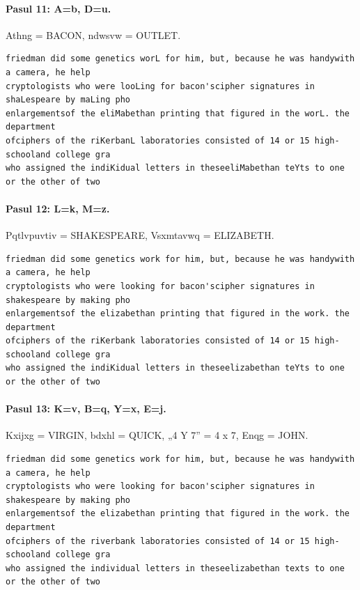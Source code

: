 \paragraph{Pasul 11: A=b, D=u.} Athng = BACON, ndwsvw = OUTLET.
\begin{lstlisting}[language={}]
friedman did some genetics worL for him, but, because he was handywith a camera, he help
cryptologists who were looLing for bacon'scipher signatures in shaLespeare by maLing pho
enlargementsof the eliMabethan printing that figured in the worL. the department
ofciphers of the riKerbanL laboratories consisted of 14 or 15 high-schooland college gra
who assigned the indiKidual letters in theseeliMabethan teYts to one or the other of two
\end{lstlisting}

\paragraph{Pasul 12: L=k, M=z.} Pqtlvpuvtiv = SHAKESPEARE, Vsxmtavwq = ELIZABETH.
\begin{lstlisting}[language={}]
friedman did some genetics work for him, but, because he was handywith a camera, he help
cryptologists who were looking for bacon'scipher signatures in shakespeare by making pho
enlargementsof the elizabethan printing that figured in the work. the department
ofciphers of the riKerbank laboratories consisted of 14 or 15 high-schooland college gra
who assigned the indiKidual letters in theseelizabethan teYts to one or the other of two
\end{lstlisting}

\paragraph{Pasul 13: K=v, B=q, Y=x, E=j.} Kxijxg = VIRGIN, bdxhl = QUICK, „4 Y 7” = 4 x 7, Enqg = JOHN.
\begin{lstlisting}[language={}]
friedman did some genetics work for him, but, because he was handywith a camera, he help
cryptologists who were looking for bacon'scipher signatures in shakespeare by making pho
enlargementsof the elizabethan printing that figured in the work. the department
ofciphers of the riverbank laboratories consisted of 14 or 15 high-schooland college gra
who assigned the individual letters in theseelizabethan texts to one or the other of two
\end{lstlisting}
